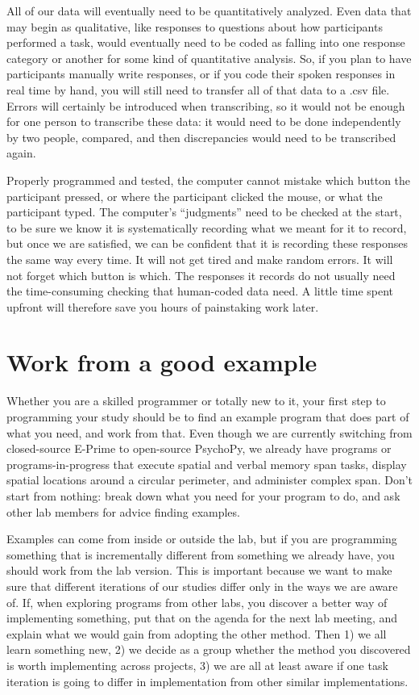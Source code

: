 \documentclass[
  12pt,
]{book}
\begin{document}
All of our data will eventually need to be quantitatively analyzed. Even data that may begin as qualitative, like responses to questions about how participants performed a task, would eventually need to be coded as falling into one response category or another for some kind of quantitative analysis. So, if you plan to have participants manually write responses, or if you code their spoken responses in real time by hand, you will still need to transfer all of that data to a .csv file. Errors will certainly be introduced when transcribing, so it would not be enough for one person to transcribe these data: it would need to be done independently by two people, compared, and then discrepancies would need to be transcribed again.

Properly programmed and tested, the computer cannot mistake which button the participant pressed, or where the participant clicked the mouse, or what the participant typed. The computer's ``judgments'' need to be checked at the start, to be sure we know it is systematically recording what we meant for it to record, but once we are satisfied, we can be confident that it is recording these responses the same way every time. It will not get tired and make random errors. It will not forget which button is which. The responses it records do not usually need the time-consuming checking that human-coded data need. A little time spent upfront will therefore save you hours of painstaking work later.

\section{Work from a good example}\label{work-from-a-good-example}

Whether you are a skilled programmer or totally new to it, your first step to programming your study should be to find an example program that does part of what you need, and work from that. Even though we are currently switching from closed-source E-Prime to open-source PsychoPy, we already have programs or programs-in-progress that execute spatial and verbal memory span tasks, display spatial locations around a circular perimeter, and administer complex span. Don't start from nothing: break down what you need for your program to do, and ask other lab members for advice finding examples.

Examples can come from inside or outside the lab, but if you are programming something that is incrementally different from something we already have, you should work from the lab version. This is important because we want to make sure that different iterations of our studies differ only in the ways we are aware of. If, when exploring programs from other labs, you discover a better way of implementing something, put that on the agenda for the next lab meeting, and explain what we would gain from adopting the other method. Then 1) we all learn something new, 2) we decide as a group whether the method you discovered is worth implementing across projects, 3) we are all at least aware if one task iteration is going to differ in implementation from other similar implementations.
\end{document}
